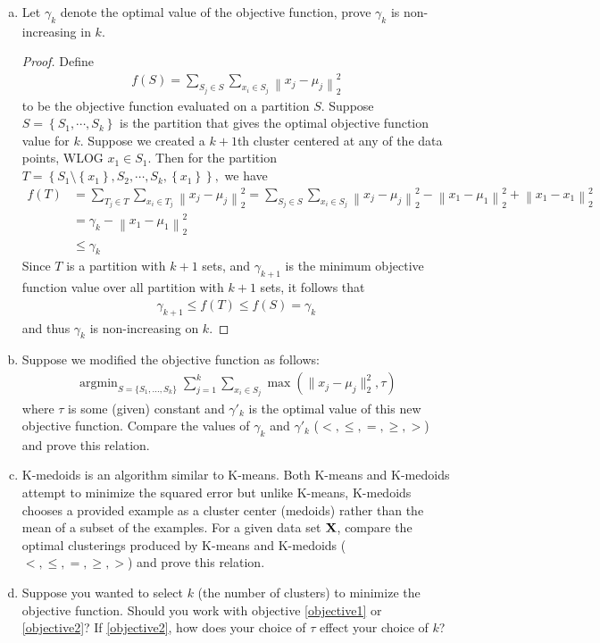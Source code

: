 \documentclass{article}
\newcommand{\X}{{\bf X}}
\begin{document}
	\begin{enumerate}[(a)]
		\item Let $\gamma_k$ denote the optimal value of the objective function, prove $\gamma_k$ is non-increasing in $k$.
			\begin{proof}
				Define
				\begin{align*}
					f(S) = \sum_{S_j\in S}^{}\sum_{x_i\in S_j}^{}\left\lVert x_j-\mu_j \right\rVert_2^2
				\end{align*}
				to be the objective function evaluated on a partition $S.$ Suppose $S=\left\{ S_1, \cdots, S_k \right\}$ is the partition that gives the optimal objective function value for $k.$ Suppose we created a $k+1$th cluster centered at any of the data points, WLOG $x_1\in S_1.$ Then for the partition $T=\left\{ S_1\setminus\left\{ x_1 \right\}, S_2, \cdots, S_k, \left\{ x_1 \right\} \right\},$ we have
				\begin{align*}
					f(T) &= \sum_{T_j\in T}^{}\sum_{x_i\in T_j}^{}\left\lVert x_j-\mu_j \right\rVert_2^2 = \sum_{S_j\in S}^{}\sum_{x_i\in S_j}^{}\left\lVert x_j-\mu_j \right\rVert_2^2 - \left\lVert x_1-\mu_1 \right\rVert_2^2 + \left\lVert x_1-x_1 \right\rVert_2^2 \\
					&= \gamma_k - \left\lVert x_1-\mu_1 \right\rVert_2^2 \\
					&\le \gamma_k
				\end{align*}
				Since $T$ is a partition with $k+1$ sets, and $\gamma_{k+1}$ is the minimum objective function value over all partition with $k+1$ sets, it follows that
				\begin{align*}
					\gamma_{k+1} \le f(T) \le f(S) = \gamma_{k}
				\end{align*}
				and thus $\gamma_k$ is non-increasing on $k.$
			\end{proof}
		\item Suppose we modified the objective function as follows:
			\begin{eqnarray}
				\mathop{\textrm{argmin}}_{S=\{S_1,...,S_k\}}\sum_{j=1}^k\sum_{x_i\in S_j}\max(\|x_j-\mu_j\|_2^2, \tau)
				\label{objective2}
			\end{eqnarray}
			where $\tau$ is some (given) constant and $\gamma'_k$ is the optimal value of this new objective function. Compare the values of 
			$\gamma_k$ and $\gamma'_k$ ($<, \le, =, \ge, >$) and prove this relation.
		\item K-medoids is an algorithm similar to K-means. Both K-means and K-medoids attempt to minimize the squared error but unlike K-means, K-medoids chooses a provided example as a cluster center (medoids) rather than the mean of a subset of the examples. For a given data set $\X$, compare the optimal clusterings produced by K-means and K-medoids ($<, \le, =, \ge, >$) and prove this relation.
		\item Suppose you wanted to select $k$ (the number of clusters) to minimize the objective function. Should you work with objective \ref{objective1} or \ref{objective2}? If \ref{objective2}, how does your choice of $\tau$ effect your choice of $k$?
	\end{enumerate}


	
\end{document}
